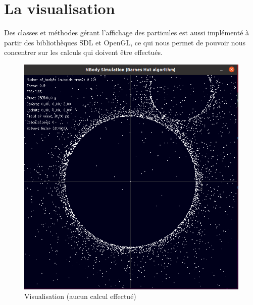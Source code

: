 \section{La visualisation}
Des classes et méthodes gérant l'affichage des particules est aussi implémenté à partir des bibliothèques SDL et OpenGL, ce qui nous permet de pouvoir nous concentrer sur les calculs qui doivent être effectués.

\begin{figure}[!h]
\begin{center}
\includegraphics[width=13cm]{aff.png}
\end{center}
\caption{Visualisation (aucun calcul effectué)}
\end{figure}
 
